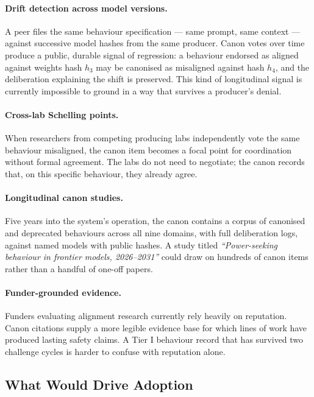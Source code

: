 \documentclass[11pt,a4paper]{article}
\begin{document}
\paragraph{Drift detection across model versions.} A peer files
the same behaviour specification --- same prompt, same context
--- against successive model hashes from the same producer.
Canon votes over time produce a public, durable signal of
regression: a behaviour endorsed as aligned against weights hash
$h_3$ may be canonised as misaligned against hash $h_4$, and the
deliberation explaining the shift is preserved. This kind of
longitudinal signal is currently impossible to ground in a way
that survives a producer's denial.

\paragraph{Cross-lab Schelling points.} When researchers from
competing producing labs independently vote the same behaviour
misaligned, the canon item becomes a focal point for
coordination without formal agreement. The labs do not need to
negotiate; the canon records that, on this specific behaviour,
they already agree.

\paragraph{Longitudinal canon studies.} Five years into the
system's operation, the canon contains a corpus of canonised
and deprecated behaviours across all nine domains, with full
deliberation logs, against named models with public hashes. A
study titled \emph{``Power-seeking behaviour in frontier models,
2026--2031''} could draw on hundreds of canon items rather than
a handful of one-off papers.

\paragraph{Funder-grounded evidence.} Funders evaluating
alignment research currently rely heavily on reputation. Canon
citations supply a more legible evidence base for which lines of
work have produced lasting safety claims. A Tier I behaviour
record that has survived two challenge cycles is harder to
confuse with reputation alone.

\subsection{What Would Drive Adoption}
\end{document}
